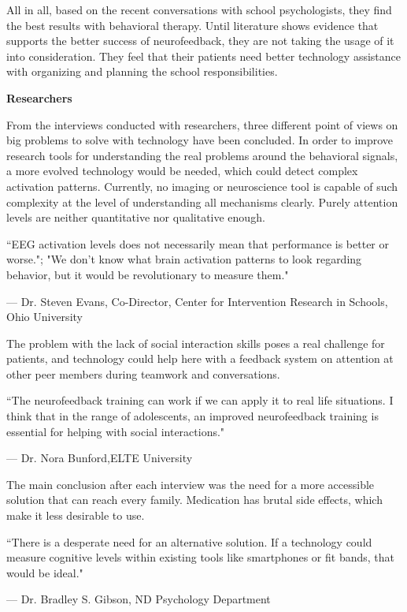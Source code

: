 \documentclass[letterpaper,10pt]{article}
\begin{document}
All in all, based on the recent conversations with school psychologists, they find the best results with behavioral therapy. Until literature shows evidence that supports the better success of neurofeedback, they are not taking the usage of it into consideration. They feel that their patients need better technology assistance with organizing and planning the school responsibilities.


\textbf{Researchers}

From the interviews conducted with researchers, three different point of views on big problems to solve with technology have been concluded. 
In order to improve research tools for understanding the real problems around the behavioral signals, a more evolved technology would be needed, which could detect complex activation patterns. Currently, no imaging or neuroscience tool is capable of such complexity at the level of understanding all mechanisms clearly. Purely attention levels are neither quantitative nor qualitative enough. 

\textcolor{myblue}{\textcolor{myblue}{\epigraph{``EEG activation levels does not necessarily mean that performance is better or worse."; "We don't know what brain activation patterns to look regarding behavior, but it would be revolutionary to measure them."}{--- \textup{Dr. Steven Evans}, Co-Director, Center for Intervention Research in Schools, Ohio University}}}

The problem with the lack of social interaction skills poses a real challenge for patients, and technology could help here with a feedback system on attention at other peer members during teamwork and conversations. 

\textcolor{myblue}{\epigraph{``The neurofeedback training can work if we can apply it to real life situations. I think that in the range of adolescents, an improved neurofeedback training is essential for helping with social interactions."}{--- \textup{Dr. Nora Bunford},ELTE University}}

The main conclusion after each interview was the need for a more accessible solution that can reach every family. Medication has brutal side effects, which make it less desirable to use. 

\textcolor{myblue}{\epigraph{``There is a desperate need for an alternative solution. If a technology could measure cognitive levels within existing tools like smartphones or fit bands, that would be ideal."}{--- \textup{ Dr. Bradley S. Gibson}, ND Psychology Department }}
\end{document}
